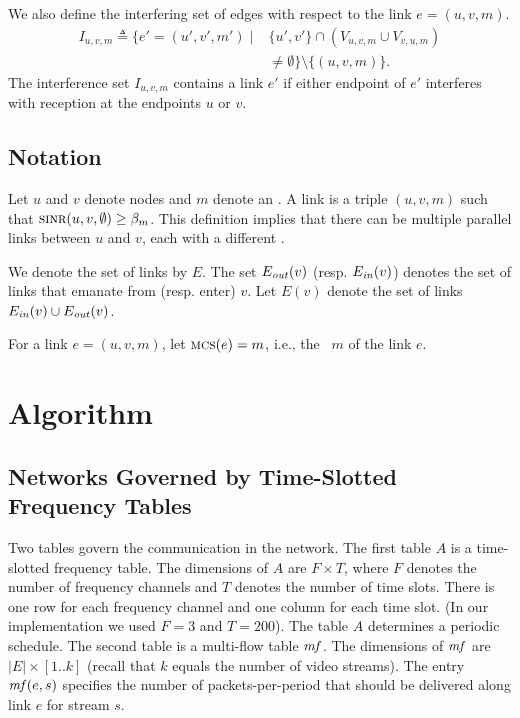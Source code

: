 \documentclass[12pt]{article}
\newtheorem{claim}[theorem]{Claim}
\newenvironment{proof sketch}[1]{\noindent {\emph{Proof sketch of #1:}}}{\hfill \qed}
\newcommand{\eqdf}{\triangleq}
\newcommand{\SINR}{\text{\sc{sinr}}}
\newcommand{\mf}{\text{\emph{mf}}}
\newcommand{\MCS}{\text{\sc{mcs}}}
\newcommand{\Ein}{E_{\text{\emph{in}}}}
\newcommand{\Eout}{E_{\text{\emph{out}}}}
\begin{document}
We also define the interfering set of edges with respect to the link $e=(u,v,m)$.
\begin{align*}
  I_{u,v,m} \eqdf \{ e'=(u',v',m') \mid &\{u',v'\} \cap (V_{u,v,m} \cup V_{v,u,m})
\\
& \neq \emptyset\} \setminus \{(u,v,m)\}.
\end{align*}
The interference set $I_{u,v,m}$ contains a link $e'$ if either
endpoint of $e'$ interferes with reception at the endpoints $u$ or
$v$.

\subsection{Notation}

Let $u$ and $v$ denote nodes and $m$ denote an \MCS.  A link is a
triple $(u,v,m)$ such that $\SINR(u,v,\emptyset)\geq \beta_m$.  This
definition implies that there can be multiple parallel links between
$u$ and $v$, each with a different \MCS.

We denote the set of links by $E$. The set $\Eout(v)$ (resp.
$\Ein(v)$) denotes the set of links that emanate from (resp. enter)
$v$. Let $E(v)$ denote the set of links $\Ein(v)\cup \Eout(v)$.

For a link $e=(u,v,m)$, let $\MCS(e)=m$, i.e., the \MCS\ $m$ of the link $e$.



\section{Algorithm}\label{sec:outline}
\subsection{Networks Governed by Time-Slotted Frequency Tables}
Two tables govern the communication in the network.  The first table
$A$ is a time-slotted frequency table. The dimensions of $A$ are
$F\times T$, where $F$ denotes the number of frequency channels and
$T$ denotes the number of time slots.  There is one row for each
frequency channel and one column for each time slot. (In our
implementation we used $F=3$ and $T=200$).  The table $A$ determines a
periodic schedule.  The second table is a multi-flow table $\mf$. The
dimensions of $\mf$ are $|E|\times [1..k]$ (recall that $k$ equals the
number of video streams).  The entry $\mf(e,s)$ specifies the number
of packets-per-period that should be delivered along link $e$ for
stream $s$.
\end{document}
